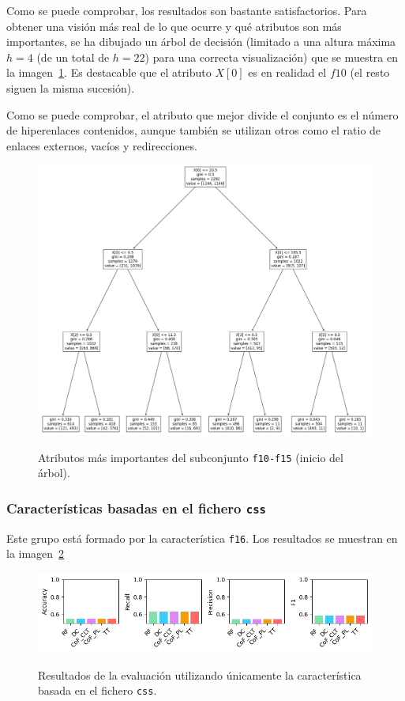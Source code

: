 Como se puede comprobar, los resultados son bastante satisfactorios. Para obtener una visión más real de lo que ocurre y qué atributos son más importantes, se ha dibujado un árbol de decisión (limitado a una altura máxima $h = 4$ (de un total de $h = 22$) para una correcta visualización) que se muestra en la imagen~\ref{gr:ph-f10f15_tree}. Es destacable que el atributo $X[0]$ es en realidad el $f10$ (el resto siguen la misma sucesión).

Como se puede comprobar, el atributo que mejor divide el conjunto es el número de hiperenlaces contenidos, aunque también se utilizan otros como el ratio de enlaces externos, vacíos y redirecciones.

\begin{figure}[h]
	\caption[\textit{Phishing}: detección (\texttt{f10-f15}, atributos relevantes DT)]{Atributos más importantes del subconjunto \texttt{f10-f15} (inicio del árbol).}
	\centering
	\includegraphics[width=\textwidth]{../img/memoria/5_phishing/f10f15_tree}
	\label{gr:ph-f10f15_tree}
\end{figure}


\subsubsection{Características basadas en el fichero \texttt{css}}
Este grupo está formado por la característica \texttt{f16}. Los resultados se muestran en la imagen~\ref{gr:ph-f16_small}

\begin{figure}[h]
	\caption[\textit{Phishing}: detección (\texttt{f16})]{Resultados de la evaluación utilizando únicamente la característica basada en el fichero \texttt{css}.}
	\centering
	\includegraphics[width=\textwidth]{../img/memoria/5_phishing/f16_small}
	\label{gr:ph-f16_small}
\end{figure}

